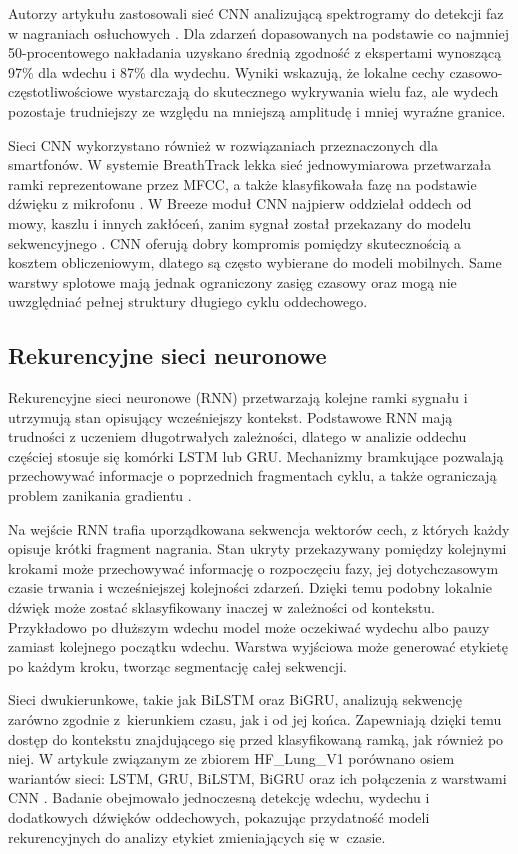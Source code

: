 Autorzy artykułu zastosowali sieć CNN analizującą spektrogramy do detekcji faz w nagraniach osłuchowych \cite{jacome2019breathingCNN}. Dla zdarzeń dopasowanych na podstawie co najmniej 50-procentowego nakładania uzyskano średnią zgodność z ekspertami wynoszącą 97\% dla wdechu i 87\% dla wydechu. Wyniki wskazują, że lokalne cechy czasowo-częstotliwościowe wystarczają do skutecznego wykrywania wielu faz, ale wydech pozostaje trudniejszy ze względu na mniejszą amplitudę i mniej wyraźne granice.

Sieci CNN wykorzystano również w rozwiązaniach przeznaczonych dla smartfonów. W systemie BreathTrack lekka sieć jednowymiarowa przetwarzała ramki reprezentowane przez MFCC, a także klasyfikowała fazę na podstawie dźwięku z mikrofonu \cite{10.1145/3478123}. W Breeze moduł CNN najpierw oddzielał oddech od mowy, kaszlu i innych zakłóceń, zanim sygnał został przekazany do modelu sekwencyjnego \cite{10.1145/3369835}. CNN oferują dobry kompromis pomiędzy skutecznością a kosztem obliczeniowym, dlatego są często wybierane do modeli mobilnych. Same warstwy splotowe mają jednak ograniczony zasięg czasowy oraz mogą nie uwzględniać pełnej struktury długiego cyklu oddechowego.

\subsection{Rekurencyjne sieci neuronowe}

Rekurencyjne sieci neuronowe (RNN) przetwarzają kolejne ramki sygnału i utrzymują stan opisujący wcześniejszy kontekst. Podstawowe RNN mają trudności z uczeniem długotrwałych zależności, dlatego w analizie oddechu częściej stosuje się komórki LSTM lub GRU. Mechanizmy bramkujące pozwalają przechowywać informacje o poprzednich fragmentach cyklu, a także ograniczają problem zanikania gradientu \cite{hochreiter1997long,cho2014learning}.

Na wejście RNN trafia uporządkowana sekwencja wektorów cech, z których każdy opisuje krótki fragment nagrania. Stan ukryty przekazywany pomiędzy kolejnymi krokami może przechowywać informację o rozpoczęciu fazy, jej dotychczasowym czasie trwania i wcześniejszej kolejności zdarzeń. Dzięki temu podobny lokalnie dźwięk może zostać sklasyfikowany inaczej w zależności od kontekstu. Przykładowo po dłuższym wdechu model może oczekiwać wydechu albo pauzy zamiast kolejnego początku wdechu. Warstwa wyjściowa może generować etykietę po każdym kroku, tworząc segmentację całej sekwencji.

Sieci dwukierunkowe, takie jak BiLSTM oraz BiGRU, analizują sekwencję zarówno zgodnie z~kierunkiem czasu, jak i od jej końca. Zapewniają dzięki temu dostęp do kontekstu znajdującego się przed klasyfikowaną ramką, jak również po niej. W artykule związanym ze zbiorem HF\_Lung\_V1 porównano osiem wariantów sieci: LSTM, GRU, BiLSTM, BiGRU oraz ich połączenia z warstwami CNN \cite{hsu2021hfLung}. Badanie obejmowało jednoczesną detekcję wdechu, wydechu i dodatkowych dźwięków oddechowych, pokazując przydatność modeli rekurencyjnych do analizy etykiet zmieniających się w~czasie.

